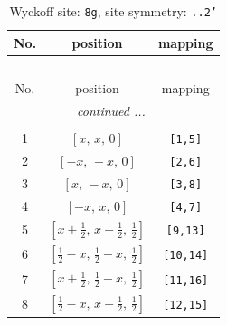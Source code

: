 \documentclass[fleqn,8pt]{jsarticle}
\begin{document}
\renewcommand{\arraystretch}{1.2}
\begin{longtable}{ccc}
\caption{Wyckoff site: {\tt 8g}, site symmetry: {\tt ..2'}}
 \\
 \hline \hline
No. & position & mapping \\ \hline \endfirsthead

\multicolumn{2}{l}{\tablename\ \thetable{}} \\
 \hline \hline
No. & position & mapping \\ \hline \endhead

 \hline \hline
\multicolumn{2}{r}{\footnotesize\it continued ...} \\ \endfoot

 \hline \hline
\multicolumn{2}{r}{} \\ \endlastfoot

1 & $\left[ x,\, x,\, 0 \right]$ & {\tt [1,5]} \\ \hline
2 & $\left[ - x,\, - x,\, 0 \right]$ & {\tt [2,6]} \\ \hline
3 & $\left[ x,\, - x,\, 0 \right]$ & {\tt [3,8]} \\ \hline
4 & $\left[ - x,\, x,\, 0 \right]$ & {\tt [4,7]} \\ \hline
5 & $\left[ x + \frac{1}{2},\, x + \frac{1}{2},\, \frac{1}{2} \right]$ & {\tt [9,13]} \\ \hline
6 & $\left[ \frac{1}{2} - x,\, \frac{1}{2} - x,\, \frac{1}{2} \right]$ & {\tt [10,14]} \\ \hline
7 & $\left[ x + \frac{1}{2},\, \frac{1}{2} - x,\, \frac{1}{2} \right]$ & {\tt [11,16]} \\ \hline
8 & $\left[ \frac{1}{2} - x,\, x + \frac{1}{2},\, \frac{1}{2} \right]$ & {\tt [12,15]} \\
\end{longtable}
\renewcommand{\arraystretch}{1.2}
\end{document}
